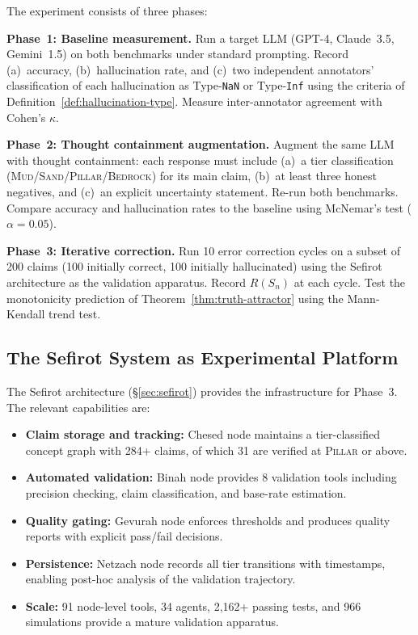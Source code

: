 \documentclass[11pt]{article}
\theoremstyle{definition}
\theoremstyle{remark}
\newcommand{\NaN}{\texttt{NaN}}
\newcommand{\Inf}{\texttt{Inf}}
\newcommand{\BEDROCK}{\textsc{Bedrock}}
\newcommand{\PILLAR}{\textsc{Pillar}}
\newcommand{\SAND}{\textsc{Sand}}
\newcommand{\MUD}{\textsc{Mud}}
\begin{document}
The experiment consists of three phases:

\medskip
\noindent\textbf{Phase~1: Baseline measurement.}\quad
Run a target LLM (GPT-4, Claude~3.5, Gemini~1.5) on both benchmarks under
standard prompting.  Record (a)~accuracy, (b)~hallucination rate, and
(c)~two independent annotators' classification of each hallucination as
Type-\NaN{} or Type-\Inf{} using the criteria of
Definition~\ref{def:hallucination-type}.  Measure inter-annotator agreement
with Cohen's $\kappa$.

\medskip
\noindent\textbf{Phase~2: Thought containment augmentation.}\quad
Augment the same LLM with thought containment: each response must include
(a)~a tier classification (\MUD{}/\SAND{}/\PILLAR{}/\BEDROCK) for its main
claim, (b)~at least three honest negatives, and (c)~an explicit uncertainty
statement.  Re-run both benchmarks.  Compare accuracy and hallucination rates
to the baseline using McNemar's test ($\alpha = 0.05$).

\medskip
\noindent\textbf{Phase~3: Iterative correction.}\quad
Run 10 error correction cycles on a subset of 200 claims (100 initially
correct, 100 initially hallucinated) using the Sefirot architecture as the
validation apparatus.  Record $R(S_n)$ at each cycle.  Test the monotonicity
prediction of Theorem~\ref{thm:truth-attractor} using the Mann-Kendall
trend test.

\subsection{The Sefirot System as Experimental Platform}
\label{sec:sefirot-platform}

The Sefirot architecture (\S\ref{sec:sefirot}) provides the infrastructure
for Phase~3.  The relevant capabilities are:

\begin{itemize}
  \item \textbf{Claim storage and tracking:} Chesed node maintains a
    tier-classified concept graph with 284+ claims, of which 31 are verified
    at \PILLAR{} or above.
  \item \textbf{Automated validation:} Binah node provides 8 validation tools
    including precision checking, claim classification, and base-rate
    estimation.
  \item \textbf{Quality gating:} Gevurah node enforces thresholds and
    produces quality reports with explicit pass/fail decisions.
  \item \textbf{Persistence:} Netzach node records all tier transitions with
    timestamps, enabling post-hoc analysis of the validation trajectory.
  \item \textbf{Scale:} 91 node-level tools, 34 agents, 2,162+ passing tests,
    and 966 simulations provide a mature validation apparatus.
\end{itemize}
\end{document}
